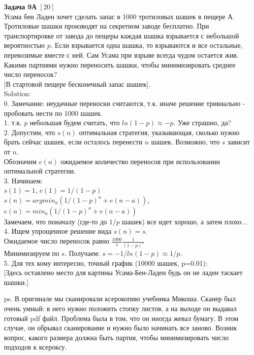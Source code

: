 \documentclass[12pt, a4paper]{article}\usepackage[]{graphicx}\usepackage[]{color}
\begin{document}
	\textbf{Задача 9А} $[20]$ \\
	Усама бен Ладен хочет сделать запас в 1000 тротиловых шашек в пещере А. Тротиловые шашки производят на секретном заводе бесплатно. При транспортировке от завода до пещеры каждая шашка взрывается с небольшой вероятностью $p$. Если взрывается одна шашка, то взрываются и все остальные, перевозимые вместе с ней. Сам Усама при взрыве всегда чудом остается жив. Какими партиями нужно переносить шашки, чтобы минимизировать среднее число переносок? \\
	$[$В стартовой пещере бесконечный запас шашек$]$. \\
	Solution: \\
	0. Замечание: неудачные переноски считаются, т.к. иначе решение тривиально - пробовать нести по 1000 шашек.\\
	1. т.к. $p$ небольшая будем считать, что $ln(1-p)\approx -p$. Уже страшно, да? \\
	2. Допустим, что $s(n)$ оптимальная стратегия, указывающая, сколько нужно брать сейчас шашек, если осталось перенести $n$ шашек. Возможно, что $s$ зависит от $n$. \\
	Обозначим $e(n)$ ожидаемое количество переносов при использовании оптимальной стратегии. \\
	3. Начинаем: \\
	$s(1)=1$, $e(1)=1/(1-p)$ \\
	$s(n)=argmin_{a}(1/(1-p)^{a}+e(n-a))$, $e(n)=min_{a}(1/(1-p)^{a}+e(n-a))$ \\
	Замечаем, что поначалу (где-то до $1/p$ шашек) все идет хорошо, а затем плохо... \\
	4. Ищем упрощенное решение вида $s(n)=s$. \\
	Ожидаемое число переносок равно $\frac{1000}{s}\frac{1}{(1-p)^{s}}$ \\
	Минимизируем по $s$. Получаем: $s=-1/ln(1-p)\approx 1/p$. \\
	5. Для тех кому интересно, точный график (10000 шашек, p=0.01): \\

	$[$Здесь оставлено место для картины Усама-Бен-Ладен будь он не ладен таскает шашки.$]$

	ps. В оригинале мы сканировали ксерокопию учебника Микоша. Сканер был очень умный: в него нужно положить стопку листов, а на выходе он выдавал готовый pdf файл. Проблема была в том, что он иногда жевал бумагу. В этом случае, он обрывал сканирование и нужно было начинать все заново. Возник вопрос, какого размера должна быть партия, чтобы минимизировать число подходов к ксероксу.
\end{document}
